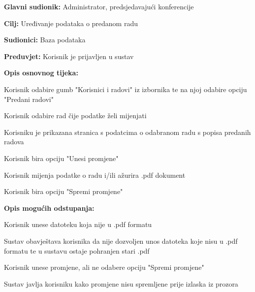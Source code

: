 				                                                            
					\noindent {}
					\begin{packed_item}
						\item \textbf{Glavni sudionik:} Administrator, predsjedavajući konferencije
						\item \textbf{Cilj:} Uređivanje podataka o predanom radu
						\item \textbf{Sudionici:} Baza podataka
						\item \textbf{Preduvjet:} Korisnik je prijavljen u sustav 
						
						\item \textbf{Opis osnovnog tijeka:} 
						\item[] \begin{packed_enum}
							
							\item Korisnik odabire gumb "Korisnici i radovi" iz izbornika te na njoj odabire opciju "Predani radovi"
							\item Korisnik odabire rad čije podatke želi mijenjati
							\item Korisniku je prikazana stranica s podatcima o odabranom radu s popisa predanih radova
							\item Korisnik bira opciju "Unesi promjene"
							\item Korisnik mijenja podatke o radu i/ili ažurira .pdf dokument
							\item Korisnik bira opciju "Spremi promjene"
						\end{packed_enum}
						
						\item \textbf{Opis mogućih odstupanja:}
						\item[] \begin{packed_enum}
							       
							
							\item[5.a] Korisnik unese datoteku koja nije u .pdf formatu
							\item[] \begin{packed_enum}
								\item[1.] Sustav obavještava korisnika da nije dozvoljen unos datoteka koje nisu u .pdf formatu te u sustavu ostaje pohranjen stari .pdf
							\end{packed_enum}
							\item[6.a] Korisnik unese promjene, ali ne odabere opciju "Spremi promjene"
							\item[] \begin{packed_enum}
								\item[1.] Sustav javlja korisniku kako promjene nisu spremljene prije izlaska iz prozora
							\end{packed_enum}               
						\end{packed_enum}
					\end{packed_item}
					                                     
